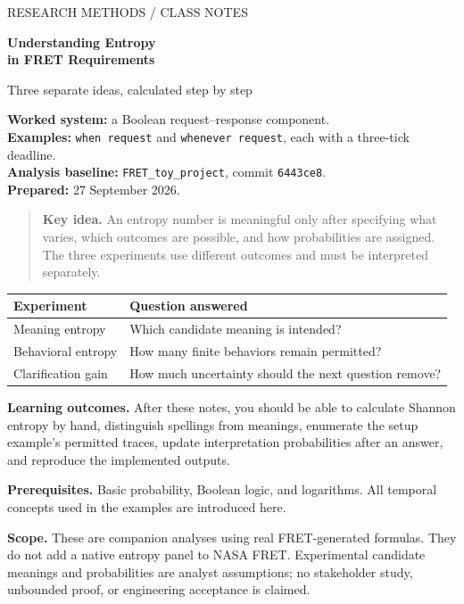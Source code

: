 \documentclass[11pt,a4paper]{article}
\newcommand{\key}[1]{\begin{quote}\color{teal}\textbf{Key idea.} #1\end{quote}}
\begin{document}
\thispagestyle{empty}
{\color{teal}\large RESEARCH METHODS / CLASS NOTES}\par
\vspace{12mm}
{\color{navy}\Huge\bfseries Understanding Entropy\\[3mm]in FRET Requirements}\par
\vspace{5mm}
{\Large Three separate ideas, calculated step by step}\par
\vspace{8mm}
\textbf{Worked system:} a Boolean request--response component.\\
\textbf{Examples:} \texttt{when request} and \texttt{whenever request}, each with a three-tick deadline.\\
\textbf{Analysis baseline:} \texttt{FRET\_toy\_project}, commit \texttt{6443ce8}.\\
\textbf{Prepared:} 27 September 2026.

\vspace{5mm}
\key{An entropy number is meaningful only after specifying what varies, which outcomes are possible, and how probabilities are assigned. The three experiments use different outcomes and must be interpreted separately.}

\begin{center}
\begin{tabular}{p{39mm}p{94mm}}
\toprule
\textbf{Experiment} & \textbf{Question answered}\\\midrule
Meaning entropy & Which candidate meaning is intended?\\[3pt]
Behavioral entropy & How many finite behaviors remain permitted?\\[3pt]
Clarification gain & How much uncertainty should the next question remove?\\\bottomrule
\end{tabular}
\end{center}

\textbf{Learning outcomes.} After these notes, you should be able to calculate Shannon entropy by hand, distinguish spellings from meanings, enumerate the setup example's permitted traces, update interpretation probabilities after an answer, and reproduce the implemented outputs.

\textbf{Prerequisites.} Basic probability, Boolean logic, and logarithms. All temporal concepts used in the examples are introduced here.

\textbf{Scope.} These are companion analyses using real FRET-generated formulas. They do not add a native entropy panel to NASA FRET. Experimental candidate meanings and probabilities are analyst assumptions; no stakeholder study, unbounded proof, or engineering acceptance is claimed.
\end{document}

